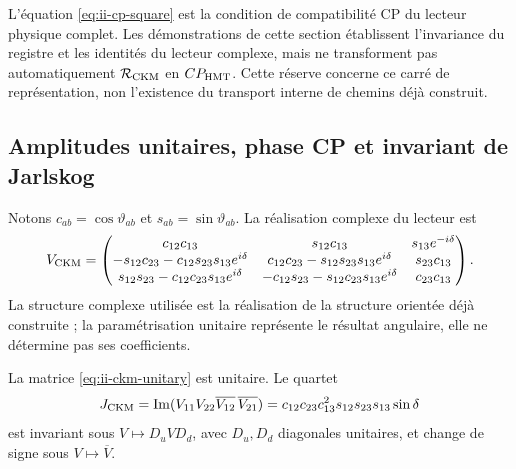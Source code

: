\begin{remark}
L’équation \eqref{eq:ii-cp-square} est la condition de
compatibilité CP du lecteur physique complet.
Les démonstrations de cette section établissent l’invariance du
registre et les identités du lecteur complexe, mais ne transforment pas
automatiquement \(\mathcal R_{\rm CKM}\) en \(CP_{\rm HMT}\).
Cette réserve concerne ce carré de représentation, non
l’existence du transport interne de chemins déjà construit.
\end{remark}

\subsection{Amplitudes unitaires, phase CP et invariant de Jarlskog}

Notons \(c_{ab}=\cos\vartheta_{ab}\) et
\(s_{ab}=\sin\vartheta_{ab}\). La réalisation complexe du lecteur est
\begingroup
\small
\setlength{\arraycolsep}{3pt}
\begin{equation}
 V_{\rm CKM}=
 \begin{pmatrix}
 c_{12}c_{13}&s_{12}c_{13}&s_{13}e^{-i\delta}\\
 -s_{12}c_{23}-c_{12}s_{23}s_{13}e^{i\delta}&
 c_{12}c_{23}-s_{12}s_{23}s_{13}e^{i\delta}&s_{23}c_{13}\\
 s_{12}s_{23}-c_{12}c_{23}s_{13}e^{i\delta}&
 -c_{12}s_{23}-s_{12}c_{23}s_{13}e^{i\delta}&c_{23}c_{13}
 \end{pmatrix}.
 \label{eq:ii-ckm-unitary}
\end{equation}
\endgroup
La structure complexe utilisée est la réalisation de la structure
orientée déjà construite ; la paramétrisation unitaire représente le résultat
angulaire, elle ne détermine pas ses coefficients.

\begin{proposition}
La matrice \eqref{eq:ii-ckm-unitary} est unitaire. Le quartet
\begin{equation}
 J_{\rm CKM}
 =\operatorname{Im}
   (V_{11}V_{22}\overline{V_{12}}\,\overline{V_{21}})
 =c_{12}c_{23}c_{13}^2s_{12}s_{23}s_{13}\sin\delta
 \label{eq:ii-jarlskog}
\end{equation}
est invariant sous \(V\mapsto D_uVD_d\), avec \(D_u,D_d\) diagonales
unitaires, et change de signe sous \(V\mapsto\overline V\).
\end{proposition}

